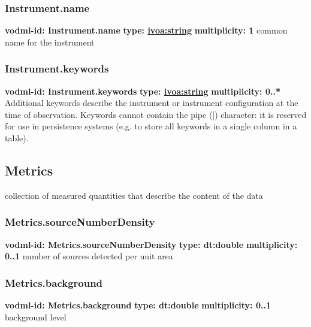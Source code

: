     \subsubsection{Instrument.name}
      \textbf{vodml-id: Instrument.name} \newline
      \textbf{type: \hyperref[sect:ivoa]{ivoa:string}} \newline
      \textbf{multiplicity: 1} \newline
      common name for the instrument

    \subsubsection{Instrument.keywords}
      \textbf{vodml-id: Instrument.keywords} \newline
      \textbf{type: \hyperref[sect:ivoa]{ivoa:string}} \newline
      \textbf{multiplicity: 0..*} \newline
      Additional keywords describe the instrument or instrument configuration at the time of observation. Keywords cannot contain the pipe (|) character: it is reserved for use in persistence systems (e.g. to store all keywords in a single column in a table).

  \subsection{Metrics}
  \label{sect:Metrics}
    collection of measured quantities that describe the content of the data

    \subsubsection{Metrics.sourceNumberDensity}
      \textbf{vodml-id: Metrics.sourceNumberDensity} \newline
      \textbf{type: dt:double} \newline
      \textbf{multiplicity: 0..1} \newline
      number of sources detected per unit area

    \subsubsection{Metrics.background}
      \textbf{vodml-id: Metrics.background} \newline
      \textbf{type: dt:double} \newline
      \textbf{multiplicity: 0..1} \newline
      background level

